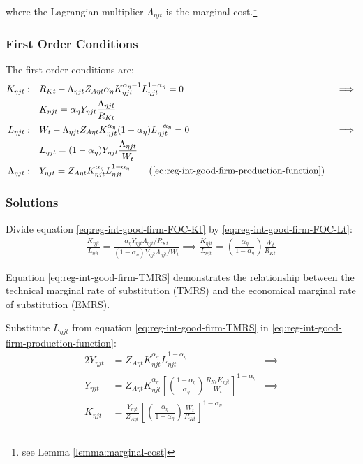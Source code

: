 \documentclass[../thesis.tex]{subfiles}
\begin{document}
where the Lagrangian multiplier $\Lambda_{\eta jt}$ is the marginal cost.\footnote{see Lemma \ref{lemma:marginal-cost}}

\subsubsection*{First Order Conditions}

The first-order conditions are:
\begin{alignat}{2}
	K_{\eta jt}: \quad & R_{Kt} - \Lambda_{\eta jt} Z_{A\eta t} {\alpha_{\eta}} K_{\eta jt}^{{\alpha_{\eta}}-1} L_{\eta jt}^{1-{\alpha_{\eta}}} = 0 &&\implies \nonumber \\
	& K_{\eta jt} = {\alpha_{\eta}} Y_{\eta jt} \frac{\Lambda_{\eta jt}}{R_{Kt}} \label{eq:reg-int-good-firm-FOC-Kt} \\
	L_{\eta jt}: \quad & W_t - \Lambda_{\eta jt} Z_{A\eta t} K_{\eta jt}^{\alpha_{\eta}} (1-{\alpha_{\eta}}) L_{\eta jt}^{-{\alpha_{\eta}}} = 0 \quad &&\implies \nonumber \\ 
	& L_{\eta jt} = (1-{\alpha_{\eta}}) Y_{\eta jt} \frac{\Lambda_{\eta jt}}{W_t} \label{eq:reg-int-good-firm-FOC-Lt} \\
	\Lambda_{\eta jt}: \quad & Y_{\eta jt} = Z_{A\eta t} K_{\eta jt}^{\alpha_{\eta}} L_{\eta jt}^{1-{\alpha_{\eta}}} \tag{\ref{eq:reg-int-good-firm-production-function}}
\end{alignat}

\subsubsection*{Solutions}

Divide equation \ref{eq:reg-int-good-firm-FOC-Kt} by \ref{eq:reg-int-good-firm-FOC-Lt}:
\begin{align}
	\frac{K_{\eta jt}}{L_{\eta jt}} = \frac{{\alpha_{\eta}} Y_{\eta jt} \Lambda_{\eta jt} /R_{Kt}}{(1-{\alpha_{\eta}}) Y_{\eta jt} \Lambda_{\eta jt} /W_t} \implies
	\frac{K_{\eta jt}}{L_{\eta jt}} = \left( \frac{{\alpha_{\eta}}}{1-{\alpha_{\eta}}} \right) \frac{W_t}{R_{Kt}} \label{eq:reg-int-good-firm-TMRS}
\end{align}

Equation \ref{eq:reg-int-good-firm-TMRS} demonstrates the relationship between the technical marginal rate of substitution (TMRS) and the economical marginal rate of substitution (EMRS). 

Substitute $L_{\eta jt}$ from equation \ref{eq:reg-int-good-firm-TMRS} in \ref{eq:reg-int-good-firm-production-function}:
\begin{alignat}{2}
	Y_{\eta jt} & = Z_{A\eta t} K_{\eta jt}^{\alpha_{\eta}} L_{\eta jt}^{1-{\alpha_{\eta}}} &\implies \nonumber \\
	Y_{\eta jt} & = Z_{A\eta t} K_{\eta jt}^{\alpha_{\eta}} \left[ \left( \frac{1-{\alpha_{\eta}}}{{\alpha_{\eta}}} \right) \frac{R_{Kt} K_{\eta jt}}{W_t} \right]^{1-{\alpha_{\eta}}} &\implies \nonumber \\
	K_{\eta jt} & = \frac{Y_{\eta jt}}{Z_{A\eta t}} \left[ \left( \frac{{\alpha_{\eta}}}{1-{\alpha_{\eta}}} \right) \frac{W_t}{R_{Kt}}\right]^{1-{\alpha_{\eta}}} \label{eq:reg-int-good-firm-Kt-demand}
\end{alignat}
\end{document}
